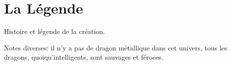 \section{La Légende}

Histoire et légende de la création.

Notes diverses: il n'y a pas de dragon métallique dans cet univers, tous les 
dragons, quoiqu'intelligents, sont sauvages et féroces.

